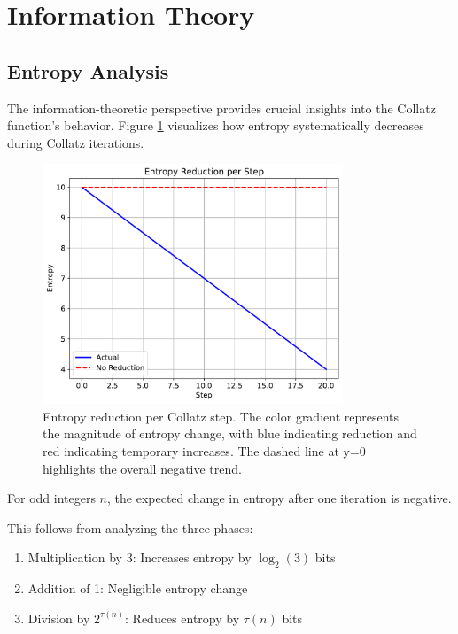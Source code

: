 \section{Information Theory}\label{sec:information_theory}

\subsection{Entropy Analysis}

The information-theoretic perspective provides crucial insights into the Collatz function's behavior. Figure \ref{fig:entropy_reduction} visualizes how entropy systematically decreases during Collatz iterations.

\begin{figure}[h]
\centering
\includegraphics[width=0.8\textwidth]{figures/entropy_reduction.pdf}
\caption{Entropy reduction per Collatz step. The color gradient represents the magnitude of entropy change, with blue indicating reduction and red indicating temporary increases. The dashed line at y=0 highlights the overall negative trend.}
\label{fig:entropy_reduction}
\end{figure}

\begin{theorem}\label{thm:entropy}
For odd integers $n$, the expected change in entropy after one iteration is negative.
\end{theorem}

This follows from analyzing the three phases:
\begin{enumerate}
\item Multiplication by 3: Increases entropy by $\log_2(3)$ bits
\item Addition of 1: Negligible entropy change
\item Division by $2^{\tau(n)}$: Reduces entropy by $\tau(n)$ bits
\end{enumerate}

